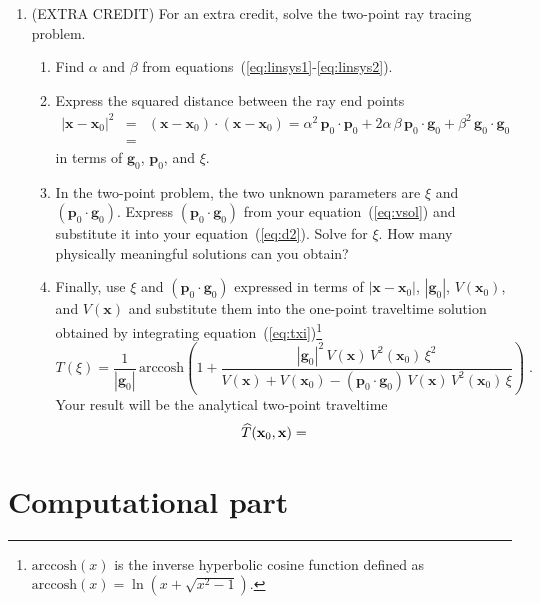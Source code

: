 \begin{enumerate}
\item (EXTRA CREDIT) For an extra credit, solve the
  two-point ray tracing problem. 
\begin{enumerate}
\item Find $\alpha$ and $\beta$ from
  equations~(\ref{eq:linsys1}-\ref{eq:linsys2}).
\item Express the squared distance between the ray end points
  \begin{eqnarray}
  \nonumber
    |\mathbf{x} - \mathbf{x}_0|^2 & = & (\mathbf{x} - \mathbf{x}_0) \cdot (\mathbf{x} - \mathbf{x}_0) =
    \alpha^2\,\mathbf{p}_0 \cdot \mathbf{p}_0 + 2 \alpha\,\beta\,\mathbf{p}_0 \cdot \mathbf{g}_0 +
    \beta^2\,\mathbf{g}_0 \cdot \mathbf{g}_0 \\
    & = & 
    \label{eq:d2} 
  \end{eqnarray}
  in terms of $\mathbf{g}_0$, $\mathbf{p}_0$, and $\xi$. 
\item In the two-point problem, the two unknown
  parameters are $\xi$ and $(\mathbf{p}_0 \cdot \mathbf{g}_0)$.
  Express $(\mathbf{p}_0 \cdot \mathbf{g}_0)$ from your
  equation~(\ref{eq:vsol}) and substitute it into your
  equation~(\ref{eq:d2}). Solve for $\xi$. How many physically
  meaningful solutions can you obtain?
\item Finally, use $\xi$ and $(\mathbf{p}_0 \cdot \mathbf{g}_0)$ 
  expressed in terms of $|\mathbf{x} - \mathbf{x}_0|$,
  $|\mathbf{g}_0|$, $V(\mathbf{x}_0)$, and $V(\mathbf{x})$ and
  substitute them into the one-point traveltime solution obtained by
  integrating equation~(\ref{eq:txi})\footnote{$\mbox{arccosh}(x)$ is
  the inverse hyperbolic cosine function defined as $\mbox{arccosh}(x)
  = \ln\left(x + \sqrt{x^2-1}\right)$.}  
  \begin{equation}
  \label{eq:t1} T(\xi) =
  \frac{1}{|\mathbf{g}_0|}\,\mbox{arccosh}\left(1 +
  \frac{|\mathbf{g}_0|^2\,V(\mathbf{x})\,V^2(\mathbf{x}_0)\,\xi^2}
  {V(\mathbf{x})+V(\mathbf{x}_0) - (\mathbf{p}_0 \cdot
  \mathbf{g}_0)\,V(\mathbf{x})\,V^2(\mathbf{x}_0)\,\xi}\right)\;.
  \end{equation} 
Your result will be the analytical two-point
  traveltime \begin{eqnarray} \label{eq:t2}
  \widehat{T}(\mathbf{x}_0,\mathbf{x}) = & & \hfill \ \end{eqnarray}
\end{enumerate}
\end{enumerate}

\section{Computational part}

